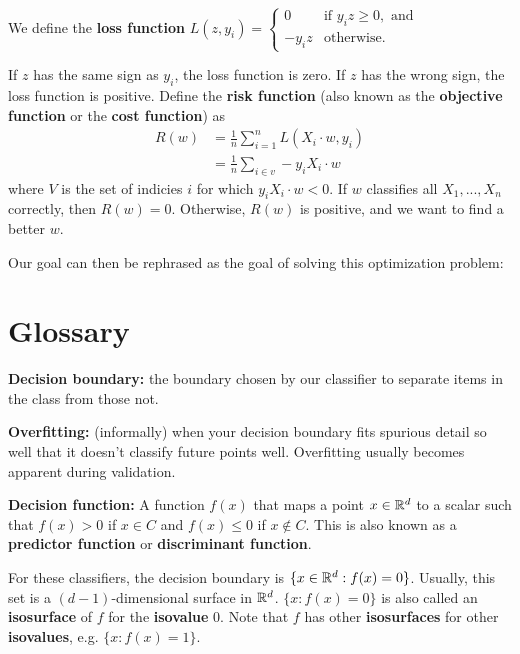 We define the \textbf{loss function}
$L(z, y_i) = \begin{cases}
    0 
    &\text{if } y_i z \geq 0, \text{ and} \\
    -y_iz
    &\text{otherwise}.
\end{cases}$

If $z$ has the same sign as $y_i$, the loss function is zero.
If $z$ has the wrong sign, the loss function is positive.
Define the \textbf{risk function} (also known as the \textbf{objective function} or the \textbf{cost function}) as
\begin{align*}
R(w) &= \frac{1}{n}\sum_{i=1}^nL(X_i \cdot w, y_i) \\
    &= \frac{1}{n}\sum_{i \in v} -y_i X_i \cdot w
\end{align*}
where $V$ is the set of indicies $i$ for which $y_iX_i \cdot w < 0$.
If $w$ classifies all $X_1, ..., X_n$ correctly, then $R(w) = 0$.
Otherwise, $R(w)$ is positive, and we want to find a better $w$.

Our goal can then be rephrased as the goal of solving this optimization problem:
\begin{center}
\end{center}












    








\section{Glossary}
\textbf{Decision boundary:} the boundary chosen by our classifier to separate items in the class from those not.

\textbf{Overfitting:} (informally) when your decision boundary fits spurious detail so well that it doesn't classify future points well.
Overfitting usually becomes apparent during validation.

\textbf{Decision function:}
A function $f(x)$ that maps a point $x \in \mathbb R^d$ to a scalar such that
$f(x) > 0$ if $x \in C$ and $f(x) \leq 0$ if $x \notin C$.
This is also known as a \textbf{predictor function} or \textbf{discriminant function}.

For these classifiers, the decision boundary is $\{x \in \mathbb R^d : f(x) = 0\}$.
Usually, this set is a $(d-1)$-dimensional surface in $\mathbb R^d$.
$\{x: f(x) = 0\}$ is also called an \textbf{isosurface} of $f$ for the \textbf{isovalue} 0.
Note that $f$ has other \textbf{isosurfaces} for other \textbf{isovalues}, e.g. $\{x : f(x) = 1\}$.
